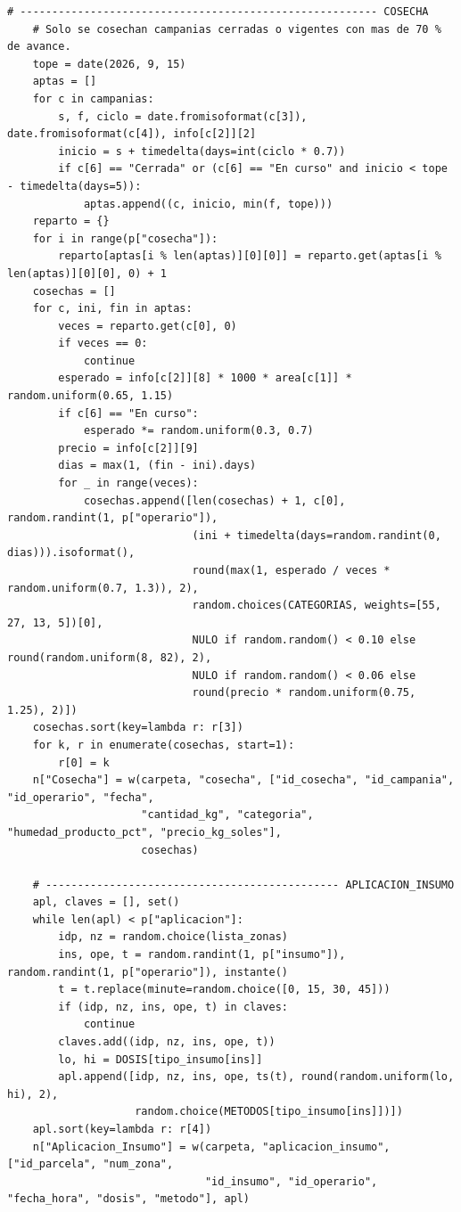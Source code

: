 \documentclass[11pt,letterpaper]{article}
\begin{document}
\begin{lstlisting}[style=py]
    # -------------------------------------------------------- COSECHA
    # Solo se cosechan campanias cerradas o vigentes con mas de 70 % de avance.
    tope = date(2026, 9, 15)
    aptas = []
    for c in campanias:
        s, f, ciclo = date.fromisoformat(c[3]), date.fromisoformat(c[4]), info[c[2]][2]
        inicio = s + timedelta(days=int(ciclo * 0.7))
        if c[6] == "Cerrada" or (c[6] == "En curso" and inicio < tope - timedelta(days=5)):
            aptas.append((c, inicio, min(f, tope)))
    reparto = {}
    for i in range(p["cosecha"]):
        reparto[aptas[i % len(aptas)][0][0]] = reparto.get(aptas[i % len(aptas)][0][0], 0) + 1
    cosechas = []
    for c, ini, fin in aptas:
        veces = reparto.get(c[0], 0)
        if veces == 0:
            continue
        esperado = info[c[2]][8] * 1000 * area[c[1]] * random.uniform(0.65, 1.15)
        if c[6] == "En curso":
            esperado *= random.uniform(0.3, 0.7)
        precio = info[c[2]][9]
        dias = max(1, (fin - ini).days)
        for _ in range(veces):
            cosechas.append([len(cosechas) + 1, c[0], random.randint(1, p["operario"]),
                             (ini + timedelta(days=random.randint(0, dias))).isoformat(),
                             round(max(1, esperado / veces * random.uniform(0.7, 1.3)), 2),
                             random.choices(CATEGORIAS, weights=[55, 27, 13, 5])[0],
                             NULO if random.random() < 0.10 else round(random.uniform(8, 82), 2),
                             NULO if random.random() < 0.06 else
                             round(precio * random.uniform(0.75, 1.25), 2)])
    cosechas.sort(key=lambda r: r[3])
    for k, r in enumerate(cosechas, start=1):
        r[0] = k
    n["Cosecha"] = w(carpeta, "cosecha", ["id_cosecha", "id_campania", "id_operario", "fecha",
                     "cantidad_kg", "categoria", "humedad_producto_pct", "precio_kg_soles"],
                     cosechas)

    # ---------------------------------------------- APLICACION_INSUMO
    apl, claves = [], set()
    while len(apl) < p["aplicacion"]:
        idp, nz = random.choice(lista_zonas)
        ins, ope, t = random.randint(1, p["insumo"]), random.randint(1, p["operario"]), instante()
        t = t.replace(minute=random.choice([0, 15, 30, 45]))
        if (idp, nz, ins, ope, t) in claves:
            continue
        claves.add((idp, nz, ins, ope, t))
        lo, hi = DOSIS[tipo_insumo[ins]]
        apl.append([idp, nz, ins, ope, ts(t), round(random.uniform(lo, hi), 2),
                    random.choice(METODOS[tipo_insumo[ins]])])
    apl.sort(key=lambda r: r[4])
    n["Aplicacion_Insumo"] = w(carpeta, "aplicacion_insumo", ["id_parcela", "num_zona",
                               "id_insumo", "id_operario", "fecha_hora", "dosis", "metodo"], apl)


\end{lstlisting}
\end{document}
